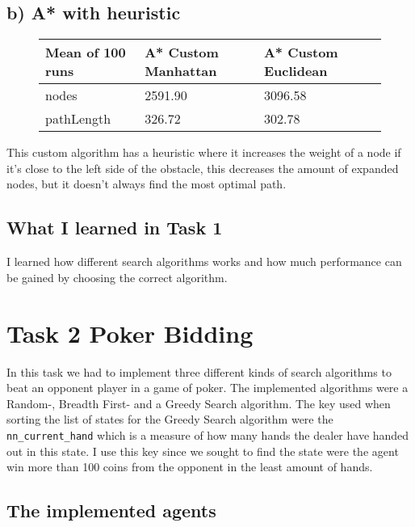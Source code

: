 \documentclass{article}
\begin{document}
\subsection{b) A* with heuristic}
\begin{figure}[H]
    \center
    \begin{tabular}{lllr}
        \toprule
        {Mean of 100 runs} & {A* Custom Manhattan} & {A* Custom Euclidean} \\
        \midrule
        nodes      &  2591.90 &  3096.58 \\
        pathLength &   326.72 &   302.78 \\
        \bottomrule  
    \end{tabular}
\end{figure}
This custom algorithm has a heuristic where it increases the weight of a node if it's close to the left side of 
the obstacle, this decreases the amount of expanded nodes, but it doesn't always find the most optimal path.
\subsection{What I learned in Task 1}
I learned how different search algorithms works and how much performance can be gained by choosing the
correct algorithm.

\newpage
\section{Task 2 Poker Bidding}
In this task we had to implement three different kinds of search algorithms to beat
an opponent player in a game of poker. The implemented algorithms were a Random-, Breadth First-
and a Greedy Search algorithm. The key used when sorting the list of states for the Greedy Search algorithm
were the \texttt{nn\_current\_hand} which is a measure of how many hands the dealer have handed out in this state.
I use this key since we sought to find the state were the agent win more than 100 coins from the opponent in the least
amount of hands.
\subsection{The implemented agents}
\end{document}
